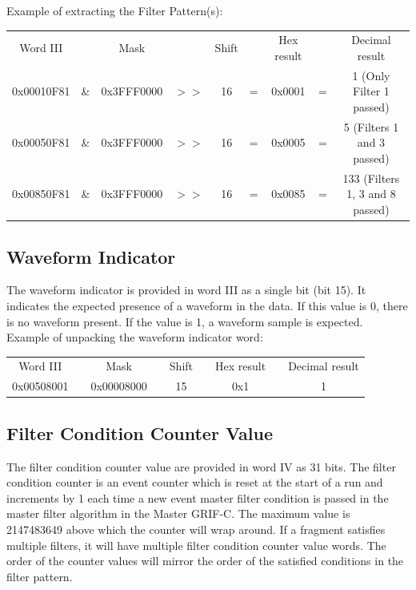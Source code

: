 \documentclass[letterpaper,12pt,notitlepage]{report}
\begin{document}
Example of extracting the Filter Pattern(s):\\

\begin{flushleft}
\begin{tabular}{ccccccccc}
Word III &  & Mask & & Shift & & Hex result & & Decimal result\\
0x00010F81 & \& & 0x3FFF0000 & $>>$ & 16 & = & 0x0001 & = & 1 (Only Filter 1 passed)\\
0x00050F81 & \& & 0x3FFF0000 & $>>$ & 16 & = & 0x0005 & = & 5 (Filters 1 and 3 passed)\\
0x00850F81 & \& & 0x3FFF0000 & $>>$ & 16 & = & 0x0085 & = & 133 (Filters 1, 3 and 8 passed)\\
\end{tabular}
\end{flushleft}

\subsection{Waveform Indicator}
The waveform indicator is provided in word III as a single bit (bit 15). It indicates the expected presence of a waveform in the data. If this value is 0, there is no waveform present. If the value is 1, a waveform sample is expected.\\

Example of unpacking the waveform indicator word:\\

\begin{tabular}{ccccccccc}
Word III &  & Mask & & Shift & & Hex result & & Decimal result\\
0x00508001 & & 0x00008000 & & 15 & & 0x1 & & 1\\
\end{tabular}

\subsection{Filter Condition Counter Value}
The filter condition counter value are provided in word IV as 31 bits. The filter condition counter is an event counter which is reset at the start of a run and increments by 1 each time a new event master filter condition is passed in the master filter algorithm in the Master GRIF-C. The maximum value is 2147483649 above which the counter will wrap around. If a fragment satisfies multiple filters, it will have multiple filter condition counter value words. The order of the counter values will mirror the order of the satisfied conditions in the filter pattern.\\
\end{document}
